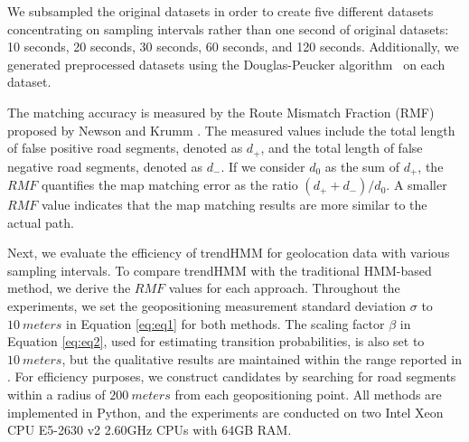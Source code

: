 \documentclass[preprint,12pt]{elsarticle}
\begin{document}
We subsampled the original datasets in order to create five different datasets concentrating on sampling intervals rather than one second of original datasets: 10 seconds, 20 seconds, 30 seconds, 60 seconds, and 120 seconds. 
Additionally, we generated preprocessed datasets using the Douglas-Peucker algorithm~\cite{saalfeld1999topologically} on each dataset.

The matching accuracy is measured by the Route Mismatch Fraction (RMF) proposed by Newson and Krumm \cite{newson2009hidden}.
The measured values include the total length of false positive road segments, denoted as $d_{+}$, and the total length of false negative road segments, denoted as $d_{-}$. If we consider $d_0$ as the sum of $d_{+}$, the $RMF$ quantifies the map matching error as the ratio $(d_{+} + d_{-}) / d_0$. A smaller $RMF$ value indicates that the map matching results are more similar to the actual path.

Next, we evaluate the efficiency of trendHMM for geolocation data with various sampling intervals. To compare trendHMM with the traditional HMM-based method, we derive the $RMF$ values for each approach.
Throughout the experiments, we set the geopositioning measurement standard deviation $\sigma$ to $10~ meters$ in Equation \ref{eq:eq1} for both methods. The scaling factor $\beta$ in Equation \ref{eq:eq2}, used for estimating transition probabilities, is also set to $10~meters$, but the qualitative results are maintained within the range reported in \cite{reinforce}.
For efficiency purposes, we construct candidates by searching for road segments within a radius of $200~meters$ from each geopositioning point. All methods are implemented in Python, and the experiments are conducted on two Intel Xeon CPU E5-2630 v2 2.60GHz CPUs with 64GB RAM.
\end{document}
